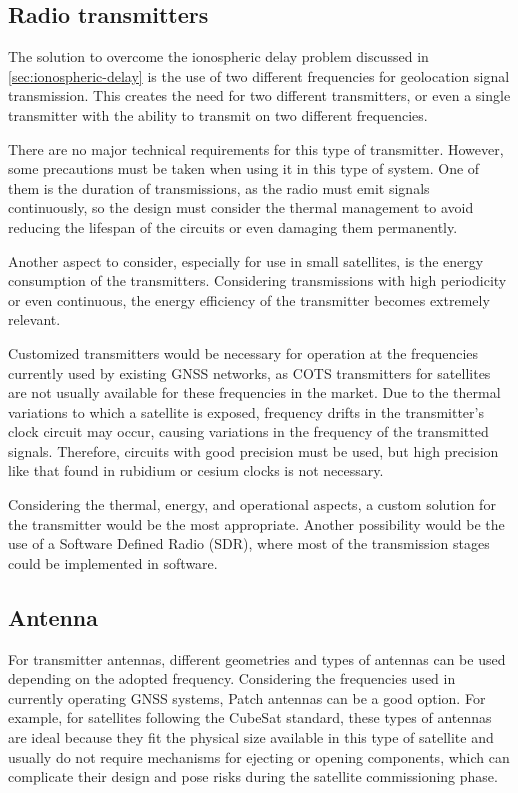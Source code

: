 \subsection{Radio transmitters}

The solution to overcome the ionospheric delay problem discussed in \autoref{sec:ionospheric-delay} is the use of two different frequencies for geolocation signal transmission. This creates the need for two different transmitters, or even a single transmitter with the ability to transmit on two different frequencies.

There are no major technical requirements for this type of transmitter. However, some precautions must be taken when using it in this type of system. One of them is the duration of transmissions, as the radio must emit signals continuously, so the design must consider the thermal management to avoid reducing the lifespan of the circuits or even damaging them permanently.

Another aspect to consider, especially for use in small satellites, is the energy consumption of the transmitters. Considering transmissions with high periodicity or even continuous, the energy efficiency of the transmitter becomes extremely relevant.

Customized transmitters would be necessary for operation at the frequencies currently used by existing GNSS networks, as COTS transmitters for satellites are not usually available for these frequencies in the market. Due to the thermal variations to which a satellite is exposed, frequency drifts in the transmitter's clock circuit may occur, causing variations in the frequency of the transmitted signals. Therefore, circuits with good precision must be used, but high precision like that found in rubidium or cesium clocks is not necessary.

Considering the thermal, energy, and operational aspects, a custom solution for the transmitter would be the most appropriate. Another possibility would be the use of a Software Defined Radio (SDR), where most of the transmission stages could be implemented in software.

\subsection{Antenna}

For transmitter antennas, different geometries and types of antennas can be used depending on the adopted frequency. Considering the frequencies used in currently operating GNSS systems, Patch antennas can be a good option. For example, for satellites following the CubeSat standard, these types of antennas are ideal because they fit the physical size available in this type of satellite and usually do not require mechanisms for ejecting or opening components, which can complicate their design and pose risks during the satellite commissioning phase.

